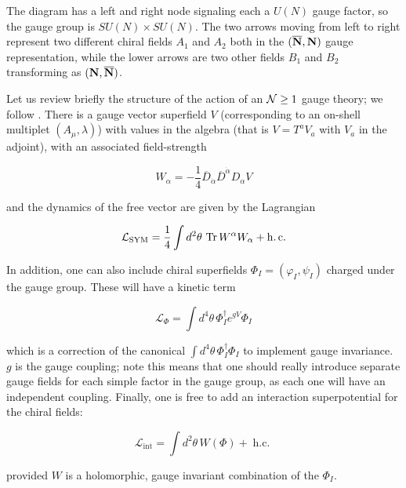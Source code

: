 The diagram has a left and right node signaling each a $U(N)$ gauge factor, so the gauge group is $SU(N)\times SU(N)$. The two arrows moving from left to right represent two different chiral fields $A_1$ and $A_2$ both in the $(\overline{\mathbf{N}},\mathbf{N})$ gauge representation, while the lower arrows are two other fields $B_1$ and $B_2$ transforming as $(\mathbf{N}, \overline{\mathbf{N}})$.

Let us review briefly the structure of the action of an $\mathcal{N} \geq 1$ gauge theory; we follow \cite{wessbagger}. There is a gauge vector superfield $V$ (corresponding to an on-shell multiplet $(A_\mu,\lambda)$) with values in the algebra (that is $V = T^a V_a$ with $V_a$ in the adjoint), with an associated field-strength

\begin{equation}
	W_\alpha = - \frac{1}{4} \overline{D}_{\dot \alpha} \overline{D}^{\dot \alpha} D_\alpha V
	\label{}
\end{equation}

and the dynamics of the free vector are given by the Lagrangian

\begin{equation}
	\mathcal{L}_\mathrm{SYM} = \frac{1}{4} \int d^2 \theta \,\operatorname{Tr} W^\alpha W_\alpha + \operatorname{h.c.}
	\label{kineticsym}
\end{equation}

In addition, one can also include chiral superfields $\Phi_I = (\varphi_I, \psi_I)$ charged under the gauge group. These will have a kinetic term

\begin{equation}
	\mathcal{L}_\Phi = \int d^4\theta\, \Phi^\dagger_I e^{gV} \Phi_I
	\label{}
\end{equation}

which is a correction of the canonical $\int d^4 \theta \, \Phi^\dagger_I \Phi_I$ to implement gauge invariance. $g$ is the gauge coupling; note this means that one should really introduce separate gauge fields for each simple factor in the gauge group, as each one will have an independent coupling. Finally, one is free to add an interaction superpotential for the chiral fields:

\begin{equation}
	\mathcal{L}_\mathrm{int} = \int d^2 \theta\, W(\Phi) + \operatorname{h.c.}
	\label{}
\end{equation}

provided $W$ is a holomorphic, gauge invariant combination of the $\Phi_I$.

